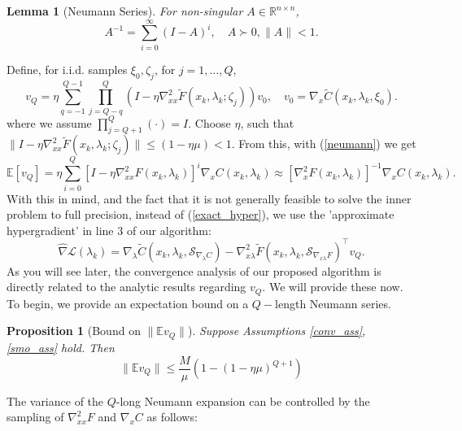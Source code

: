 \documentclass[11pt, twoside]{report}
\newtheorem{proposition}[theorem]{Proposition}
\newtheorem{lemma}[theorem]{Lemma}
\begin{document}
\begin{lemma}[Neumann Series] \label{neumannlem}
For non-singular $A \in \mathbb{R}^{n \times n}$,
\begin{equation} \label{neumann} 
    A^{-1} = \sum^{\infty}_{i=0} (I-A)^i, \quad A \succ 0, \|A\| < 1.
\end{equation}
\end{lemma}
Define, for i.i.d. samples $\xi_0, \zeta_j$, for $j=1,\hdots,Q$,
\begin{equation} \label{HIA_stocBio}
    v_Q= \eta \sum_{q=-1}^{Q-1} \prod_{j=Q-q}^Q\left(I- \eta \nabla_{xx}^2 \tilde{F}\left(x_k, \lambda_k ; \zeta_j\right)\right) v_0, \quad v_0 = \nabla_x \tilde{C}(x_k,\lambda_k,\xi_0).
\end{equation}
where we assume $\prod_{j=Q+1}^Q (\cdot) = I$. Choose $\eta$, such that $\|I- \eta \nabla_{xx}^2 \tilde{F}\left(x_k, \lambda_k ; \zeta_j\right)\| \leq (1-\eta\mu) < 1$. From this, with (\ref{neumann}) we get
\[\mathbb{E}[v_Q] = \eta \sum_{i=0}^{Q} \left[I - \eta\nabla_{xx}^2 F \left(x_k, \lambda_k\right)\right]^i\nabla_x C(x_k,\lambda_k) \approx \left[\nabla_x^2 F\left(x_k, \lambda_k\right)\right]^{-1} \nabla_x C\left(x_k, \lambda_k\right).\]
With this in mind, and the fact that it is not generally feasible to solve the inner problem to full precision, instead of (\ref{exact_hyper}), we use the 'approximate hypergradient' in line 3 of our algorithm:
\begin{equation} \label{hat_nabla_def}
                \widehat{\nabla}\mathcal{L}(\lambda_k) = \nabla_\lambda \tilde{C}(x_k,\lambda_k,\mathcal{S}_{\nabla_\lambda C}) - \nabla_{x \lambda}^2 \tilde{F}(x_k,\lambda_k,\mathcal{S}_{\nabla_{x\lambda} F})^\top v_Q.
            \end{equation}
As you will see later, the convergence analysis of our proposed algorithm is directly related to the analytic results regarding $v_Q$. We will provide these now. To begin, we  provide an expectation bound on a $Q-$length Neumann series.
\begin{proposition}[Bound on $\|\mathbb{E}v_Q\|$] \label{evq_bnd}
    Suppose Assumptions \ref{conv_ass}, \ref{smo_ass} hold. Then 
    \[\|\mathbb{E}v_Q\| \leq \frac{M}{\mu}(1-(1-\eta\mu)^{Q+1})\]
\end{proposition}
The variance of the $Q$-long Neumann expansion can be controlled by the sampling of $\nabla_{xx}^2 F$ and $\nabla_x C$ as follows:
\end{document}
